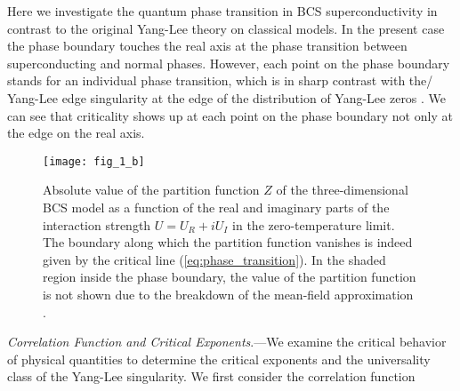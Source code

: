 \documentclass[aps,prl,twocolumn,nofootinbib,superscriptaddress,longbibliography]{revtex4-1}
\begin{document}
	Here we investigate the quantum phase transition in BCS superconductivity in contrast to the original Yang-Lee theory \cite{PhysRev.87.404,PhysRev.87.410} on classical models. In the present case the phase boundary touches the real axis at the phase transition between superconducting and normal phases. However, each point on the phase boundary stands for an individual phase transition, which is in sharp contrast with the/ Yang-Lee edge singularity at the edge of the distribution of Yang-Lee zeros \cite{Fisher:1978vn}. We can see that criticality shows up at each point on the phase boundary not only at the edge on the real axis.
	
	\begin{figure}
	\texttt{[image: fig\_1\_b]}
	
	\caption{Absolute value of the partition function $Z$ of the three-dimensional  BCS model as a function of the real and imaginary parts of the interaction strength $U=U_{R}+iU_{I}$ in the zero-temperature limit. The boundary along which the partition function vanishes is indeed given by the critical line (\ref{eq:phase_transition}). In the shaded region inside the phase boundary, the value of the partition function is not shown due to the breakdown of the mean-field approximation \cite{Yamamoto2019}.} 
	
	\label{Phase_transition_line}
	\end{figure}
	
	\emph{Correlation Function and Critical Exponents}.---We examine the critical behavior of physical quantities to determine the critical exponents and the universality class of the Yang-Lee singularity. We first consider the correlation function
	
\end{document}
